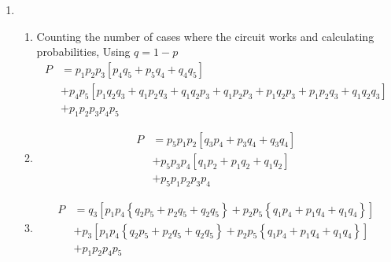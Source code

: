 \begin{enumerate}
\begin{enumerate}
\begin{subequations}
			\item \begin{align}
				P(S = 7 \ |\ X_2 = 3) = \frac{P(S = 7 \ \cap\ X_2 = 3)}{P(X_2 = 3)} = \frac{1}{6}
			\end{align}
		\end{subequations}
	\end{enumerate}
	
	\item \begin{enumerate}
		\item Counting the number of cases where the circuit works and calculating probabilities, Using $ q = 1-p $
		\begin{subequations}
			\begin{align}
				P &= p_1 p_2 p_3 \left[ p_4 q_5 + p_5 q_4 + q_4 q_5 \right] \nonumber \\
				&+ p_4 p_5 \left[ p_1 q_2 q_3 + q_1 p_2 q_3 + q_1 q_2 p_3 + q_1 p_2 p_3 + p_1 q_2 p_3 + p_1 p_2 q_3 + q_1 q_2 q_3 \right]	\nonumber \\
				&+ p_1 p_2 p_3 p_4 p_5
			\end{align}
		\end{subequations}
		
		\item \begin{subequations}
			\begin{align}
				P &= p_5 p_1 p_2 \left[ q_3 p_4 + p_3 q_4 + q_3 q_4 \right] \nonumber \\
				&+ p_5 p_3 p_4 \left[ q_1 p_2 + p_1 q_2 + q_1 q_2 \nonumber \right] \\
				&+ p_5 p_1 p_2 p_3 p_4
			\end{align}
		\end{subequations}
		
		\item \begin{subequations}
			\begin{align}
				P &= q_3 \left[ p_1 p_4 \left\{ q_2 p_5 + p_2 q_5 + q_2 q_5 \right\} + p_2 p_5 \left\{ q_1 p_4 + p_1 q_4 + q_1 q_4 \right\} \right] \nonumber \\
				&+ p_3 \left[ p_1 p_4 \left\{ q_2 p_5 + p_2 q_5 + q_2 q_5 \right\} + p_2 p_5 \left\{ q_1 p_4 + p_1 q_4 + q_1 q_4 \right\} \right] \nonumber \\
				&+ p_1 p_2 p_4 p_5 
			\end{align}
		\end{subequations}
	\end{enumerate}
	

\end{enumerate}
